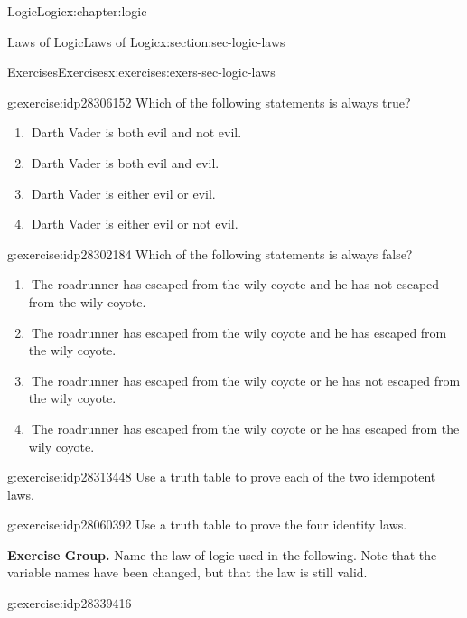 \documentclass[twoside,10pt,]{book}
\numberwithin{equation}{section}
\begin{document}
\begin{chapterptx}{Logic}{}{Logic}{}{}{x:chapter:logic}
\begin{sectionptx}{Laws of Logic}{}{Laws of Logic}{}{}{x:section:sec-logic-laws}
\typeout{************************************************}
%
\begin{exercises-subsection}{Exercises}{}{Exercises}{}{}{x:exercises:exers-sec-logic-laws}
\begin{divisionexercise}{1}{}{}{g:exercise:idp28306152}%
Which of the following statements is always true? %
\begin{enumerate}[label=(\alph*)]
\item{}\(\ \)Darth Vader is both evil and not evil.%
\item{}\(\ \)Darth Vader is both evil and evil.%
\item{}\(\ \)Darth Vader is either evil or evil.%
\item{}\(\ \)Darth Vader is either evil or not evil.%
\end{enumerate}
\end{divisionexercise}%
\begin{divisionexercise}{2}{}{}{g:exercise:idp28302184}%
Which of the following statements is always false? %
\begin{enumerate}[label=(\alph*)]
\item{}\(\ \)The roadrunner has escaped from the wily coyote and he has not escaped from the wily coyote.%
\item{}\(\ \)The roadrunner has escaped from the wily coyote and he has escaped from the wily coyote.%
\item{}\(\ \)The roadrunner has escaped from the wily coyote or he has not escaped from the wily coyote.%
\item{}\(\ \)The roadrunner has escaped from the wily coyote or he has escaped from the wily coyote.%
\end{enumerate}
\end{divisionexercise}%
\begin{divisionexercise}{3}{}{}{g:exercise:idp28313448}%
Use a truth table to prove each of the two idempotent laws.\end{divisionexercise}%
\begin{divisionexercise}{4}{}{}{g:exercise:idp28060392}%
Use a truth table to prove the four identity laws.\end{divisionexercise}%
\par\medskip\noindent%
\textbf{Exercise Group.}\space\space%
Name the law of logic used in the following.  Note that the variable names have been changed, but that the law is still valid.\begin{exercisegroup}
\begin{divisionexerciseeg}{5}{}{}{g:exercise:idp28339416}%

\end{divisionexerciseeg}
\end{exercisegroup}
\end{exercises-subsection}
\end{sectionptx}
\end{chapterptx}
\end{document}

